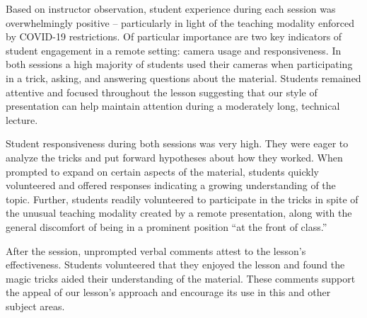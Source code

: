 Based on instructor observation, student experience during
each session was overwhelmingly positive --
particularly in light of the teaching modality enforced by COVID-19
restrictions.
Of particular importance are two key indicators
of student engagement in a remote setting: camera usage and
responsiveness.  In both sessions a high majority of students used their
cameras when participating in a trick, asking, and answering questions
about the material.  Students remained attentive and focused throughout
 the lesson suggesting that our
style of presentation can help maintain attention during a moderately long,
technical lecture.

Student responsiveness during both sessions was very high.
They were eager to analyze the
tricks and put forward hypotheses about how they worked.
When prompted to
expand on certain aspects of the material, students quickly volunteered and
offered responses indicating a growing understanding of the topic.
Further, students readily volunteered to participate in the tricks in spite
of the unusual teaching modality created by a remote presentation,
along with the general discomfort of being in a
prominent position ``at the front of class.''

After the session,
unprompted verbal comments attest to the lesson's effectiveness.
Students volunteered that they enjoyed the
lesson and found the magic tricks aided their understanding of the
material.  These comments support the appeal of our lesson's approach and
encourage its use in this and other subject areas.

